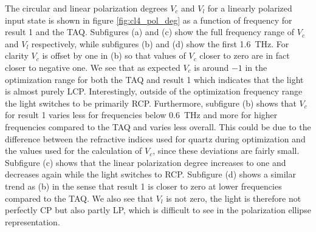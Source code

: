The circular and linear polarization degrees $V_c$ and $V_l$ for a linearly polarized input state is shown in figure \ref{fig:cl4_pol_deg} as a function of frequency for result 1 and the TAQ. Subfigures (a) and (c) show the full frequency range of $V_c$ and $V_l$ respectively, while subfigures (b) and (d) show the first \SI{1.6}{\tera \hertz}. For clarity $V_c$ is offset by one in (b) so that values of $V_c$ closer to zero are in fact closer to negative one. We see that as expected $V_c$ is around $-1$ in the optimization range for both the TAQ and result 1 which indicates that the light is almost purely LCP. Interestingly, outside of the optimization frequency range the light switches to be primarily RCP. Furthermore, subfigure (b) shows that $V_c$ for result 1 varies less for frequencies below \SI{0.6}{\tera \hertz} and more for higher frequencies compared to the TAQ and varies less overall. This could be due to the difference between the refractive indices used for quartz during optimization and the values used for the calculation of $V_c$, since these deviations are fairly small. Subfigure (c) shows that the linear polarization degree increases to one and decreases again while the light switches to RCP. Subfigure (d) shows a similar trend as (b) in the sense that result 1 is closer to zero at lower frequencies compared to the TAQ. We also see that $V_l$ is not zero, the light is therefore not perfectly CP but also partly LP, which is difficult to see in the polarization ellipse representation. 

